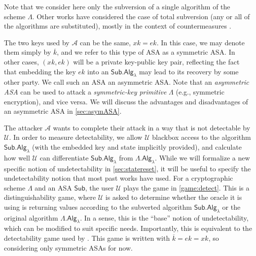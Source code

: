 Note that we consider here only the subversion of a single algorithm of the scheme $\Lambda$. Other works have considered the case of total subversion (any or all of the algorithms are substituted), mostly in the context of countermeasures \cite{ACNS:AFMV19,CCS:RTYZ17,AC:RTYZ16}.

The two keys used by $\mathcal{A}$ can be the same, $xk=ek$. In this case, we may denote them simply by $\overline{k}$, and we refer to this type of ASA as a symmetric ASA. In other cases, $(xk,ek)$ will be a private key-public key pair, reflecting the fact that embedding the key $ek$ into an $\mathsf{Sub.Alg}_\lambda$ may lead to its recovery by some other party. We call such an ASA an asymmetric ASA. Note that an \emph{asymmetric ASA} can be used to attack a \emph{symmetric-key primitive} $\mathsf{\Lambda}$ (e.g., symmetric encryption), and vice versa. We will discuss the advantages and disadvantages of an asymmetric ASA in \autoref{sec:asymASA}.

The attacker $\mathcal{A}$ wants to complete their attack in a way that is not detectable by $\mathcal{U}$. In order to measure detectability, we allow $\mathcal{U}$ blackbox access to the algorithm $\mathsf{Sub.Alg}_\lambda$ (with the embedded key and state implicitly provided), and calculate how well $\mathcal{U}$ can differentiate $\mathsf{Sub.Alg}_\lambda$ from $\mathsf{\Lambda.Alg}_\lambda$. While we will formalize a new specific notion of undetectability in \autoref{sec:statereset}, it will be useful to specify the undetectability notion that most past works have used. For a cryptographic scheme $\Lambda$ and an ASA $\mathsf{Sub}$, the user $\mathcal{U}$ plays the game in \autoref{game:detect}. This is a distinguishability game, where $\mathcal{U}$ is asked to determine whether the oracle it is using is returning values according to the subverted algorithm $\mathsf{Sub.Alg}_\lambda$ or the original algorithm $\mathsf{\Lambda.Alg}_\lambda$. In a sense, this is the ``base'' notion of undetectability, which can be modified to suit specific needs. Importantly, this is equivalent to the detectability game used by \cite{C:BelPatRog14}. This game is written with $\overline{k}=ek=xk$, so considering only symmetric ASAs for now.


